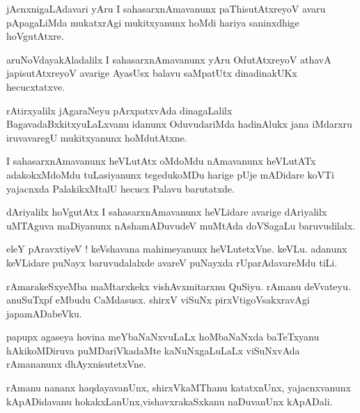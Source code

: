 \documentclass{article}
\begin{document}
\begin{mn}%
jAcnxnigaLAdavari yAru I sahasarxnAmavanunx paThisutAtxreyoV avaru pApagaLiMda mukatxrAgi 
mukitxyanunx hoMdi hariya saninxdhige hoVgutAtxre.
\end{mn}

\begin{mn}%
aruNoVdayakAladalilx I sahasarxnAmavanunx yAru OdutAtxreyoV athavA japisutAtxreyoV avarige AyasUsx 
balavu saMpatUtx dinadinakUKx hecucxtatxve.
\end{mn}

\begin{mn}%
rAtirxyalilx jAgaraNeyu pArxpatxvAda dinagaLalilx BagavadaBxkitxyuLaLxvanu idanunx OduvudariMda 
hadinAlukx jana iMdarxru iruvavaregU mukitxyanunx hoMdutAtxne.
\end{mn}

\begin{mn}%
I sahasarxnAmavanunx heVLutAtx oMdoMdu nAmavanunx heVLutATx adakokxMdoMdu tuLasiyanunx tegedukoMDu 
harige pUje mADidare koVTi yajacnxda PalakikxMtalU hecucx Palavu barutatxde.
\end{mn}

\begin{mn}%
dAriyalilx hoVgutAtx I sahasarxnAmavanunx heVLidare avarige dAriyalilx uMTAguva maDiyanunx 
nAshamADuvudeV muMtAda doVSagaLu baruvudilalx.
\end{mn}

\begin{mn}%
eleY pAravxtiyeV ! keVshavana mahimeyanunx heVLutetxVne. keVLu. adanunx keVLidare puNayx 
baruvudalalxde avareV puNayxda rUparAdavareMdu tiLi.
\end{mn}


\begin{mn}%
rAmarakeSxyeMba maMtarxkekx vishAvxmitarxnu QuSiyu. rAmanu deVvateyu. anuSuTxpf eMbudu CaMdasusx. 
shirxV viSuNx pirxVtigoVsakxravAgi japamADabeVku.
\end{mn}

\begin{mn}%
papupx agaseya hovina meYbaNaNxvuLaLx hoMbaNaNxda baTeTxyanu hAkikoMDiruva puMDariVkadaMte 
kaNuNxgaLuLaLx viSuNxvAda rAmananunx dhAyxnisutetxVne.
\end{mn}

\begin{mn}%
rAmanu nananx haqdayavanUnx, shirxVkaMThanu katatxnUnx, yajacnxvanunx kApADidavanu 
hokakxLanUnx,vishavxrakaSxkanu naDuvanUnx kApADali. 
\end{mn}
\end{document}
